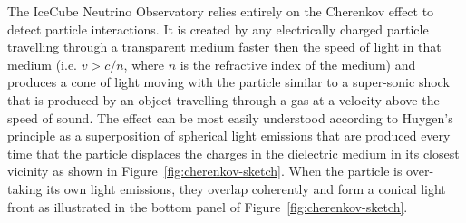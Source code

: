 The IceCube Neutrino Observatory relies entirely on the Cherenkov effect to detect particle interactions. It is created by any electrically charged particle travelling through a transparent medium faster then the speed of light in that medium (i.e. $v>c/n$, where $n$ is the refractive index of the medium) and produces a cone of light moving with the particle similar to a super-sonic shock that is produced by an object travelling through a gas at a velocity above the speed of sound. The effect can be most easily understood according to Huygen's principle as a superposition of spherical light emissions that are produced every time that the particle displaces the charges in the dielectric medium in its closest vicinity as shown in Figure~\ref{fig:cherenkov-sketch}. When the particle is over-taking its own light emissions, they overlap coherently and form a conical light front as illustrated in the bottom panel of Figure~\ref{fig:cherenkov-sketch}.
